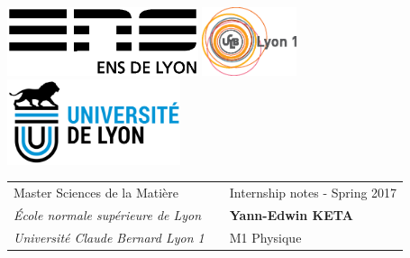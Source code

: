 \documentclass[class=report, float=false, crop=false]{standalone}
\begin{document}
\thispagestyle{empty}

\includegraphics[height=2cm]{logoens.eps} \hfill \includegraphics[height=2cm]{logoucbl.eps} \hfill \includegraphics[height=2.5cm]{udl-logo.png}

\vspace{0.5cm}

\begin{tabularx}{\textwidth}{ @{} l X l @{} }
{\sc Master Sciences de la Matière} & & Internship notes - Spring 2017 \\
{\it École normale supérieure de Lyon} & & \textbf{Yann-Edwin KETA} \\
{\it Université Claude Bernard Lyon 1} & & M1 Physique
\end{tabularx}
\end{document}
